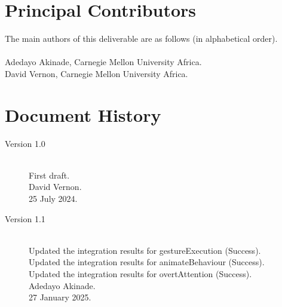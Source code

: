\documentclass{CSSRforAfrica}
\newcommand{\blank}{~\\}
\begin{document}
  
%  
 
\newpage

%                                 



\pagebreak
\section*{Principal Contributors}
\label{contributors}
The main authors of this deliverable are as follows (in alphabetical order).
\blank
~
\blank

Adedayo Akinade, Carnegie Mellon University Africa.\\
David Vernon, Carnegie Mellon University Africa.\\     

  

\newpage
\section*{Document History}
\label{document_history}

\begin{description}

\item [Version 1.0]~\\
First draft. \\
David Vernon. \\                               
25 July 2024.      

\item [Version 1.1]~\\
Updated the integration results for gestureExecution (Success). \\
Updated the integration results for animateBehaviour (Success). \\
Updated the integration results for overtAttention (Success). \\
Adedayo Akinade. \\                               
27 January 2025.   



\end{description}
\end{document}
